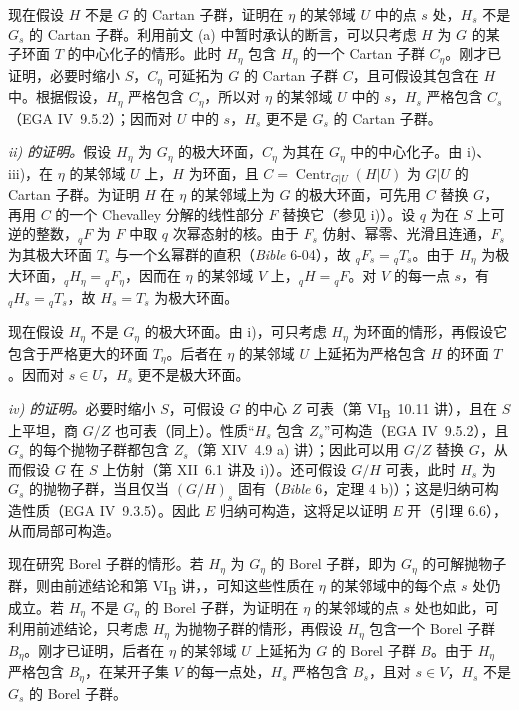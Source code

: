 现在假设 \(H\) 不是 \(G\) 的 Cartan 子群，证明在 \(\eta\) 的某邻域 \(U\) 中的点 \(s\) 处，\(H_s\) 不是 \(G_s\) 的 Cartan 子群。利用前文 (a) 中暂时承认的断言，可以只考虑 \(H\) 为 \(G\) 的某子环面 \(T\) 的中心化子的情形。此时 \(H_{\eta}\) 包含 \(H_{\eta}\) 的一个 Cartan 子群 \(C_{\eta}\)。刚才已证明，必要时缩小 \(S\)，\(C_{\eta}\) 可延拓为 \(G\) 的 Cartan 子群 \(C\)，且可假设其包含在 \(H\) 中。根据假设，\(H_{\eta}\) 严格包含 \(C_{\eta}\)，所以对 \(\eta\) 的某邻域 \(U\) 中的 \(s\)，\(H_s\) 严格包含 \(C_s\)（EGA IV~9.5.2）；因而对 \(U\) 中的 \(s\)，\(H_s\) 更不是 \(G_s\) 的 Cartan 子群。

\emph{ii) 的证明。}假设 \(H_{\eta}\) 为 \(G_{\eta}\) 的极大环面，\(C_{\eta}\) 为其在 \(G_{\eta}\) 中的中心化子。由 i)、iii)，在 \(\eta\) 的某邻域 \(U\) 上，\(H\) 为环面，且 \(C=\operatorname{Centr}_{G|U}(H|U)\) 为 \(G|U\) 的 Cartan 子群。为证明 \(H\) 在 \(\eta\) 的某邻域上为 \(G\) 的极大环面，可先用 \(C\) 替换 \(G\)，再用 \(C\) 的一个 Chevalley 分解的线性部分 \(F\) 替换它（参见 i)）。设 \(q\) 为在 \(S\) 上可逆的整数，\({}_{q}F\) 为 \(F\) 中取 \(q\) 次幂态射的核。由于 \(F_s\) 仿射、幂零、光滑且连通，\(F_s\) 为其极大环面 \(T_s\) 与一个幺幂群的直积（\emph{Bible} 6-04），故 \({}_{q}F_s={}_{q}T_s\)。由于 \(H_{\eta}\) 为极大环面，\({}_{q}H_{\eta}={}_{q}F_{\eta}\)，因而在 \(\eta\) 的某邻域 \(V\) 上，\({}_{q}H={}_{q}F\)。对 \(V\) 的每一点 \(s\)，有 \({}_{q}H_s={}_{q}T_s\)，故 \(H_s=T_s\) 为极大环面。

现在假设 \(H_{\eta}\) 不是 \(G_{\eta}\) 的极大环面。由 i)，可只考虑 \(H_{\eta}\) 为环面的情形，再假设它包含于严格更大的环面 \(T_{\eta}\)。后者在 \(\eta\) 的某邻域 \(U\) 上延拓为严格包含 \(H\) 的环面 \(T\)。因而对 \(s\in U\)，\(H_s\) 更不是极大环面。

\emph{iv) 的证明。}必要时缩小 \(S\)，可假设 \(G\) 的中心 \(Z\) 可表（第 VI\textsubscript{B}~10.11 讲），且在 \(S\) 上平坦，商 \(G/Z\) 也可表（同上）。性质“\(H_s\) 包含 \(Z_s\)”可构造（EGA IV~9.5.2），且 \(G_s\) 的每个抛物子群都包含 \(Z_s\)（第 XIV~4.9 a) 讲）；因此可以用 \(G/Z\) 替换 \(G\)，从而假设 \(G\) 在 \(S\) 上仿射（第 XII~6.1 讲及 i)）。还可假设 \(G/H\) 可表，此时 \(H_s\) 为 \(G_s\) 的抛物子群，当且仅当 \((G/H)_s\) 固有（\emph{Bible} 6，定理 4 b)）；这是归纳可构造性质（EGA IV~9.3.5）。因此 \(E\) 归纳可构造，这将足以证明 \(E\) 开（引理 6.6），从而局部可构造。

现在研究 Borel 子群的情形。若 \(H_{\eta}\) 为 \(G_{\eta}\) 的 Borel 子群，即为 \(G_{\eta}\) 的可解抛物子群，则由前述结论和第 VI\textsubscript{B} 讲，，可知这些性质在 \(\eta\) 的某邻域中的每个点 \(s\) 处仍成立。若 \(H_{\eta}\) 不是 \(G_{\eta}\) 的 Borel 子群，为证明在 \(\eta\) 的某邻域的点 \(s\) 处也如此，可利用前述结论，只考虑 \(H_{\eta}\) 为抛物子群的情形，再假设 \(H_{\eta}\) 包含一个 Borel 子群 \(B_{\eta}\)。刚才已证明，后者在 \(\eta\) 的某邻域 \(U\) 上延拓为 \(G\) 的 Borel 子群 \(B\)。由于 \(H_{\eta}\) 严格包含 \(B_{\eta}\)，在某开子集 \(V\) 的每一点处，\(H_s\) 严格包含 \(B_s\)，且对 \(s\in V\)，\(H_s\) 不是 \(G_s\) 的 Borel 子群。

